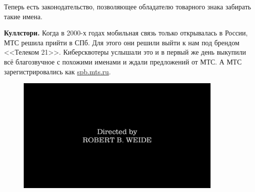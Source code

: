 Теперь есть законодательство, позволяющее обладателю товарного знака забирать такие имена.

{\bf Куллстори.} Когда в 2000-х годах мобильная связь только открывалась в России, МТС решила прийти в СПб. Для этого они решили выйти к нам под брендом <<Телеком 21>>. Киберсквотеры услышали это и в первый же день выкупили всё благозвучное с похожими именами и ждали предложений от МТС. А МТС зарегистрировались как \url{spb.mts.ru}.

\begin{figure}[h]
  \centering
  \includegraphics[width=10cm]{images/05/03}
\end{figure}

